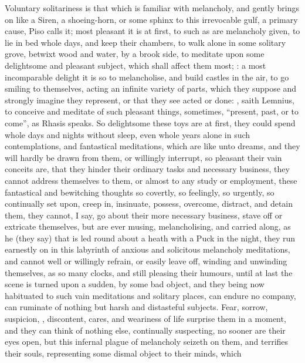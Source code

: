 Voluntary solitariness is that which is familiar with melancholy, and gently
brings on like a Siren, a shoeing-horn, or some sphinx to this irrevocable
gulf, a primary cause, Piso calls it; most pleasant it is
at first, to such as are melancholy given, to lie in bed whole days, and keep
their chambers, to walk alone in some solitary grove, betwixt wood and water,
by a brook side, to meditate upon some delightsome and pleasant subject, which
shall affect them most; : a
most incomparable delight it is so to melancholise, and build castles in the
air, to go smiling to themselves, acting an infinite variety of parts, which
they suppose and strongly imagine they represent, or that they see acted or
done: , saith Lemnius, to conceive and meditate of
such pleasant things, sometimes, \enquote{present, past, or to
come}, as Rhasis speaks. So delightsome these toys are at first, they could
spend whole days and nights without sleep, even whole years alone in such
contemplations, and fantastical meditations, which are like unto dreams, and
they will hardly be drawn from them, or willingly interrupt, so pleasant their
vain conceits are, that they hinder their ordinary tasks and necessary
business, they cannot address themselves to them, or almost to any study or
employment, these fantastical and bewitching thoughts so covertly, so
feelingly, so urgently, so continually set upon, creep in, insinuate, possess,
overcome, distract, and detain them, they cannot, I say, go about their more
necessary business, stave off or extricate themselves, but are ever musing,
melancholising, and carried along, as he (they say) that is led round about a
heath with a Puck in the night, they run earnestly on in this labyrinth of
anxious and solicitous melancholy meditations, and cannot well or willingly
refrain, or easily leave off, winding and unwinding themselves, as so many
clocks, and still pleasing their humours, until at last the scene is turned
upon a sudden, by some bad object, and they being now habituated to such vain
meditations and solitary places, can endure no company, can ruminate of nothing
but harsh and distasteful subjects. Fear, sorrow, suspicion, , discontent, cares, and weariness of life surprise them in a moment, and
they can think of nothing else, continually suspecting, no sooner are their
eyes open, but this infernal plague of melancholy seizeth on them, and
terrifies their souls, representing some dismal object to their minds, which

